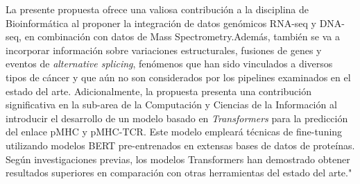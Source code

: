 \documentclass[a4paper,11pt]{article}
\begin{document}
La presente propuesta ofrece una valiosa contribución a la disciplina de Bioinformática al proponer la integración de datos genómicos RNA-seq y DNA-seq, en combinación con datos de Mass Spectrometry.Además, también se va a incorporar información sobre variaciones estructurales, fusiones de genes y eventos de \textit{alternative splicing}, fenómenos que han sido vinculados a diversos tipos de cáncer \cite{wood2020neoepiscope} y que aún no son considerados por los pipelines examinados en el estado del arte. Adicionalmente, la propuesta presenta una contribución significativa en la sub-area de la Computación y Ciencias de la Información al introducir el desarrollo de un modelo basado en \textit{Transformers} para la predicción del enlace pMHC y pMHC-TCR. Este modelo empleará técnicas de fine-tuning utilizando modelos BERT pre-entrenados en extensas bases de datos de proteínas. Según investigaciones previas, los modelos Transformers han demostrado obtener resultados superiores en comparación con otras herramientas del estado del arte."





\end{document}
